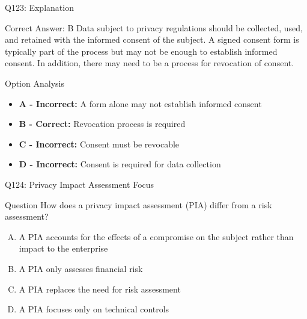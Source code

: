 \documentclass{beamer}
\begin{document}
	\begin{frame}{Q123: Explanation}
		\begin{block}{Correct Answer: B}
			Data subject to privacy regulations should be collected, used, and retained with the informed consent of the subject. A signed consent form is typically part of the process but may not be enough to establish informed consent. In addition, there may need to be a process for revocation of consent.
		\end{block}
		\begin{block}{Option Analysis}
			\begin{itemize}
				\item \textbf{A - Incorrect:} A form alone may not establish informed consent
				\item \textbf{B - Correct:} Revocation process is required
				\item \textbf{C - Incorrect:} Consent must be revocable
				\item \textbf{D - Incorrect:} Consent is required for data collection
			\end{itemize}
		\end{block}
	\end{frame}
	
	\begin{frame}{Q124: Privacy Impact Assessment Focus}
		\begin{block}{Question}
			How does a privacy impact assessment (PIA) differ from a risk assessment?
		\end{block}
		\begin{enumerate}[(A)]
			\item A PIA accounts for the effects of a compromise on the subject rather than impact to the enterprise
			\item A PIA only assesses financial risk
			\item A PIA replaces the need for risk assessment
			\item A PIA focuses only on technical controls
		\end{enumerate}
	\end{frame}
	
\end{document}

